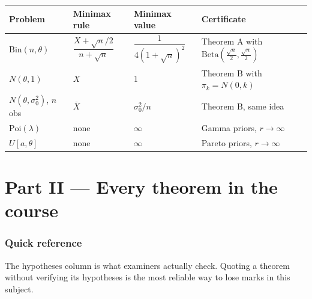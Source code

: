 \documentclass[11pt]{article}
\newcommand{\Xbar}{\overline{X}}
\begin{document}
\begin{center}
\renewcommand{\arraystretch}{1.45}
\begin{tabular}{@{}p{3.0cm}p{2.4cm}p{3.5cm}p{6.2cm}@{}}
\toprule
Problem & Minimax rule & Minimax value & Certificate \\
\midrule
$\mathrm{Bin}(n,\theta)$ & $\dfrac{X+\sqrt n/2}{n+\sqrt n}$ & $\dfrac{1}{4(1+\sqrt n)^2}$ &
Theorem A with $\mathrm{Beta}(\tfrac{\sqrt n}2,\tfrac{\sqrt n}2)$ \\
$N(\theta,1)$ & $X$ & $1$ & Theorem B with $\pi_k=N(0,k)$ \\
$N(\theta,\sigma_0^2)$, $n$ obs & $\Xbar$ & $\sigma_0^2/n$ & Theorem B, same idea \\
$\mathrm{Poi}(\lambda)$ & none & $\infty$ & Gamma priors, $r\to\infty$ \\
$U[a,\theta]$ & none & $\infty$ & Pareto priors, $r\to\infty$ \\
\bottomrule
\end{tabular}
\end{center}

\newpage
\part*{Part II --- Every theorem in the course}

\section{Quick reference}

The hypotheses column is what examiners actually check. Quoting a theorem without verifying
its hypotheses is the most reliable way to lose marks in this subject.
\end{document}
